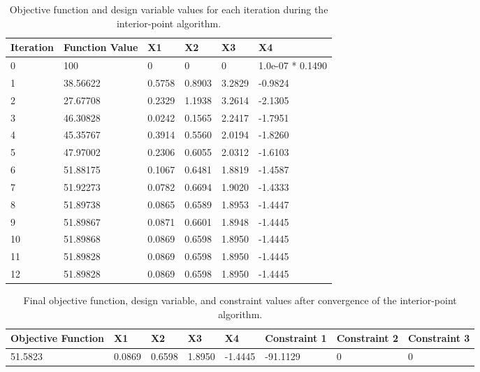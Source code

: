 \documentclass[11pt]{article}
\begin{document}
\begin{table}[htbp]
	\centering
    \begin{tabular}{|l|l|l|l|l|l|}
        \hline
        Iteration & Function Value & X1 & X2 & X3 & X4\\ \hline
0 & 100 & 0   &      0    &     0  &  1.0e-07 * 0.1490\\ 
1 & 38.56622 & 0.5758   & 0.8903  &  3.2829  & -0.9824\\ 
2 & 27.67708 & 0.2329   & 1.1938  &  3.2614  & -2.1305\\ 
3 & 46.30828 & 0.0242    &0.1565  &  2.2417  & -1.7951\\ 
4 & 45.35767& 0.3914  &  0.5560  &  2.0194  & -1.8260\\ 
5 & 47.97002 & 0.2306  &  0.6055  &  2.0312  & -1.6103 \\ 
6 & 51.88175 & 0.1067  &  0.6481  &  1.8819  & -1.4587\\ 
7 & 51.92273 & 0.0782  &  0.6694  &  1.9020  & -1.4333 \\ 
8 & 51.89738 & 0.0865  &  0.6589  &  1.8953  & -1.4447 \\
9 & 51.89867 & 0.0871  &  0.6601  &  1.8948  & -1.4445 \\ 
10 & 51.89868 & 0.0869  &  0.6598  &  1.8950  & -1.4445 \\ 
11 & 51.89828 & 0.0869  &  0.6598  &  1.8950  & -1.4445 \\ 
12 & 51.89828 &  0.0869  &  0.6598  &  1.8950 &  -1.4445\\
        \hline
    \end{tabular}
	\caption{Objective function and design variable values for each iteration during the interior-point algorithm.}
	\label{Table1}
\end{table}

\begin{table}[htbp]
	\centering
    \begin{tabular}{|l|l|l|l|l|l|l|l|}
        \hline
	Objective Function & X1 & X2 & X3 & X4 & Constraint 1 & Constraint 2 & Constraint 3 \\ \hline
	51.5823 & 0.0869 & 0.6598 & 1.8950 & -1.4445 & -91.1129 & 0 & 0 \\ 
	\hline
    \end{tabular}
	\caption{Final objective function, design variable, and constraint values after convergence of the interior-point algorithm.}
	\label{Table2}
\end{table}
\end{document}

